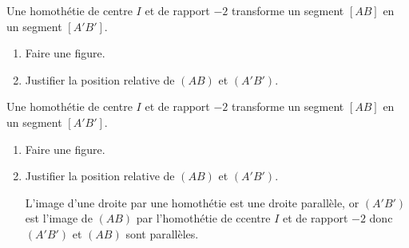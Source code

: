 \begin{exercice*}
    Une homothétie de centre $I$ et de rapport $-2$ transforme un segment $[AB]$ en un segment $[A'B']$.    
    \begin{enumerate}
        \item Faire une figure.        
        \item Justifier la position relative de $(AB)$ et $(A'B')$.
    \end{enumerate}
\end{exercice*}
\begin{corrige}
    Une homothétie de centre $I$ et de rapport $-2$ transforme un segment $[AB]$ en un segment $[A'B']$.    

    \begin{enumerate}
        \item Faire une figure.
        
        \item Justifier la position relative de $(AB)$ et $(A'B')$.
        
        {\color{red} L'image d'une droite par une homothétie est une droite parallèle, or $(A'B')$ est l'image de $(AB)$ par l'homothétie de ccentre $I$ et de rapport $-2$
        donc $(A'B')$ et $(AB)$ sont parallèles.}
    \end{enumerate}
\end{corrige}


